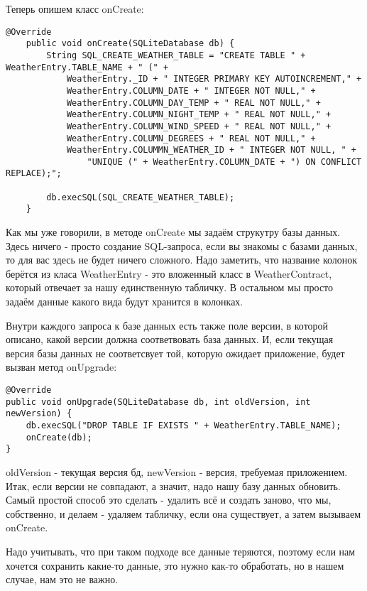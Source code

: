 \documentclass[12 pt]{article}
\begin{document}
\begin{itemize}
        Теперь опишем класс onCreate:
        \begin{lstlisting}
@Override
    public void onCreate(SQLiteDatabase db) {
        String SQL_CREATE_WEATHER_TABLE = "CREATE TABLE " + WeatherEntry.TABLE_NAME + " (" +
            WeatherEntry._ID + " INTEGER PRIMARY KEY AUTOINCREMENT," +
            WeatherEntry.COLUMN_DATE + " INTEGER NOT NULL," +
            WeatherEntry.COLUMN_DAY_TEMP + " REAL NOT NULL," +
            WeatherEntry.COLUMN_NIGHT_TEMP + " REAL NOT NULL," +
            WeatherEntry.COLUMN_WIND_SPEED + " REAL NOT NULL," +
            WeatherEntry.COLUMN_DEGREES + " REAL NOT NULL," +
            WeatherEntry.COLUMMN_WEATHER_ID + " INTEGER NOT NULL, " +
                "UNIQUE (" + WeatherEntry.COLUMN_DATE + ") ON CONFLICT REPLACE);";

        db.execSQL(SQL_CREATE_WEATHER_TABLE);
    }        
        \end{lstlisting}	    	    
	    	    
        Как мы уже говорили, в методе onCreate мы задаём струкутру базы данных.	Здесь ничего - просто создание SQL-запроса, если вы знакомы с базами данных, то для вас здесь не будет ничего сложного. Надо заметить, что название колонок берётся из класа WeatherEntry - это вложенный класс в WeatherContract, который отвечает за нашу единственную табличку. В остальном мы просто задаём данные какого вида будут хранится в колонках.   	    
	    	    
	    Внутри каждого запроса к базе данных есть также поле версии, в которой описано, какой версии должна соответвовать база данных. И, если текущая версия базы данных не соответсвует той, которую ожидает приложение, будет вызван метод onUpgrade:
	    \begin{lstlisting}
@Override
public void onUpgrade(SQLiteDatabase db, int oldVersion, int newVersion) {
    db.execSQL("DROP TABLE IF EXISTS " + WeatherEntry.TABLE_NAME);
    onCreate(db);
}	    
	    \end{lstlisting}
	    
	    oldVersion - текущая версия бд, newVersion - версия, требуемая приложением. Итак, если версии не совпадают, а значит, надо нашу базу данных обновить. Самый простой способ это сделать - удалить всё и создать заново, что мы, собственно, и делаем - удаляем табличку, если она существует, а затем вызываем onCreate. 
	    
	    Надо учитывать, что при таком подходе все данные теряются, поэтому если нам хочется сохранить какие-то данные, это нужно как-то обработать, но в нашем случае, нам это не важно.
	\end{itemize}
	
\end{document}
